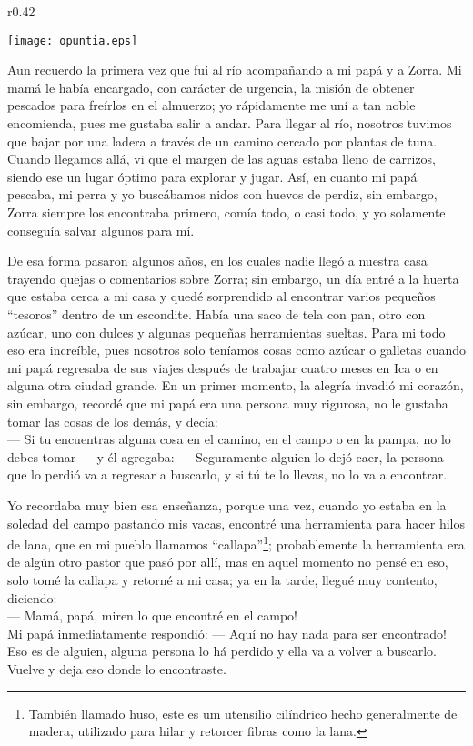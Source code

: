 \ifdefined\EnableIncludeImages
\begin{wrapfigure}{r}{0.42\textwidth}
  \begin{center}
  \vspace{-30pt}
    \texttt{[image: opuntia.eps]}
  \end{center}
  \vspace{-20pt}
\end{wrapfigure}
\fi
Aun recuerdo la primera vez que fui al río acompañando a mi papá y a Zorra. Mi mamá le había encargado, con carácter de urgencia, la misión de obtener pescados para freírlos en el almuerzo; yo rápidamente me uní a tan noble encomienda, pues me gustaba salir a andar.
Para llegar al río, nosotros tuvimos que bajar por una ladera a través de un camino cercado por plantas de tuna. Cuando llegamos allá, vi que el margen de las aguas estaba lleno de carrizos, siendo ese un lugar óptimo para explorar y jugar. Así, en cuanto mi papá pescaba, mi perra y yo buscábamos nidos con huevos de perdiz, sin embargo, Zorra siempre los encontraba primero, comía todo, o casi todo, y yo solamente conseguía salvar algunos para mí. 

De esa forma pasaron algunos años, en los cuales nadie llegó a nuestra casa trayendo quejas o comentarios sobre Zorra; sin embargo, un día entré a la huerta que estaba cerca a mi casa y quedé sorprendido al encontrar varios pequeños ``tesoros'' dentro de un escondite. Había una saco de tela con pan, otro con azúcar, uno con dulces y algunas pequeñas herramientas sueltas.
Para mi todo eso era increíble, pues nosotros solo teníamos cosas como azúcar o galletas cuando mi papá regresaba de sus viajes después de trabajar cuatro meses en Ica o en alguna otra ciudad grande. 
En un primer momento, la alegría invadió mi corazón, sin embargo, recordé que mi papá era una persona muy rigurosa, no le gustaba tomar las cosas de los demás, y decía: \\\indent
--- Si tu encuentras alguna cosa en el camino, en el campo o en la pampa, no lo debes tomar ---
y él agregaba:
--- Seguramente alguien lo dejó caer, la persona que lo perdió va a regresar a buscarlo, y si tú te lo llevas, no lo va a encontrar.

Yo recordaba muy bien esa enseñanza, porque una vez, cuando yo estaba en la soledad del campo pastando mis vacas, encontré una herramienta para hacer hilos de lana, que en mi pueblo llamamos ``callapa''\footnote{También llamado huso, este es um utensilio cilíndrico hecho generalmente de madera, utilizado para hilar y retorcer fibras como la lana.}; probablemente la herramienta era de algún otro pastor que pasó por allí, mas en aquel momento no pensé en eso, solo tomé la callapa y retorné a mi casa; ya en la tarde, llegué muy contento, diciendo:\\\indent
--- Mamá, papá, miren lo que encontré en el campo!\\\indent
Mi papá inmediatamente respondió:  
--- Aquí no hay nada para ser encontrado! Eso es de alguien, alguna persona lo há perdido y ella va a volver a buscarlo. Vuelve y deja eso donde lo encontraste.

